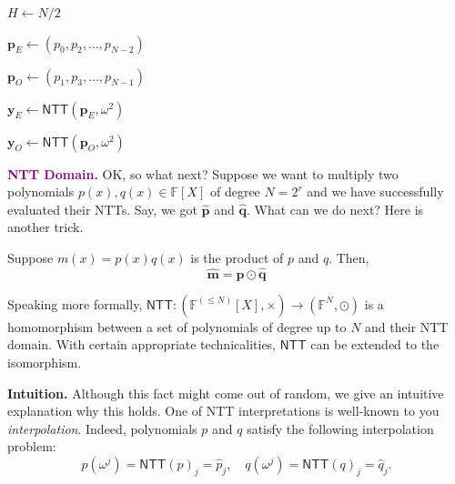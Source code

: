 \documentclass[../../book.tex]{subfiles}
\begin{document}
\begin{algorithm}[h!]
    \caption{Number Theoretic Transform (NTT)}
    \label{alg:ntt}


    $H \gets N/2$ 

    $\boldsymbol{p}_{E} \gets (p_0,p_2,\dots,p_{N-2})$ 

    $\boldsymbol{p}_{O} \gets (p_1,p_3,\dots,p_{N-1})$ 

    $\boldsymbol{y}_E \gets \mathsf{NTT}(\boldsymbol{p}_{E}, \omega^2)$ 

    $\boldsymbol{y}_O \gets \mathsf{NTT}(\boldsymbol{p}_O, \omega^2)$ 

\end{algorithm}

\textcolor{purple}{\textbf{NTT Domain.}} OK, so what next? Suppose we want to
multiply two polynomials $p(x), q(x) \in \mathbb{F}[X]$ of degree $N=2^r$ and we
have successfully evaluated their NTTs. Say, we got $\hat{\boldsymbol{p}}$ and
$\hat{\boldsymbol{q}}$. What can we do next? Here is another trick.

\begin{proposition}
    Suppose $m(x) = p(x)q(x)$ is the product of $p$ and $q$. Then,
    \begin{equation*}
        \hat{\boldsymbol{m}} = \hat{\boldsymbol{p}} \odot \hat{\boldsymbol{q}}
    \end{equation*}

    Speaking more formally, $\mathsf{NTT}: (\mathbb{F}^{(\leq N)}[X],\times) \to (\mathbb{F}^N, \odot)$ is 
    a homomorphism between a set of polynomials of degree up to $N$ and their NTT domain. With certain 
    appropriate technicalities, $\mathsf{NTT}$ can be extended to the isomorphism.
\end{proposition}

\textbf{Intuition.} Although this fact might come out of random, we give an
intuitive explanation why this holds. One of NTT interpretations is well-known to you 
\emph{interpolation}. Indeed, polynomials $p$ and $q$ satisfy the following 
interpolation problem:
\begin{equation*}
    p(\omega^j) = \mathsf{NTT}(p)_j = \hat{p}_j, \quad q(\omega^j) = \mathsf{NTT}(q)_j = \hat{q}_j.
\end{equation*}
\end{document}
